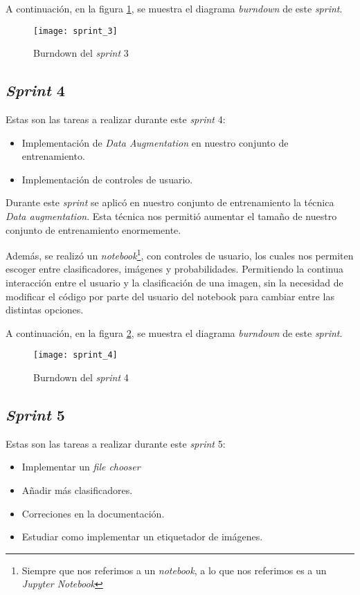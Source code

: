 A continuación, en la figura \ref{fig:A.1.4}, se muestra el diagrama \textit{burndown} de este \textit{sprint}.

\begin{figure}
\centering
\texttt{[image: sprint\_3]}
\caption{Burndown del \textit{sprint} 3}
\label{fig:A.1.4}
\end{figure}

\subsection{\textit{Sprint} 4}
Estas son las tareas a realizar durante este \textit{sprint} 4:

\begin{itemize}
	\item Implementación de \textit{Data Augmentation} en nuestro conjunto de entrenamiento.
	\item Implementación de controles de usuario.
\end{itemize}

Durante este \textit{sprint} se aplicó en nuestro conjunto de entrenamiento la técnica \textit{Data augmentation}. Esta técnica nos permitió aumentar el tamaño de nuestro conjunto de entrenamiento enormemente. 

Además, se realizó un \textit{notebook}\footnote{Siempre que nos referimos a un \textit{notebook}, a lo que nos referimos es a un \textit{Jupyter Notebook}}, con controles de usuario, los cuales nos permiten escoger entre clasificadores, imágenes y probabilidades. Permitiendo la continua interacción entre el usuario y la clasificación de una imagen, sin la necesidad de modificar el código por parte del usuario del notebook para cambiar entre las distintas opciones.

A continuación, en la figura \ref{fig:A.1.5}, se muestra el diagrama \textit{burndown} de este \textit{sprint}.

\begin{figure}
\centering
\texttt{[image: sprint\_4]}
\caption{Burndown del \textit{sprint} 4}
\label{fig:A.1.5}
\end{figure}


\subsection{\textit{Sprint} 5}
Estas son las tareas a realizar durante este \textit{sprint} 5:

\begin{itemize}
	\item Implementar un \textit{file chooser} 
	\item Añadir más clasificadores.
	\item Correciones en la documentación.
	\item Estudiar como implementar un etiquetador de imágenes.
\end{itemize}

